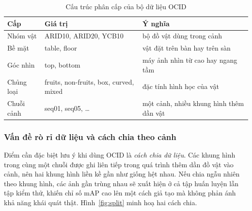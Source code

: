 \begin{table}[H]
\centering
\caption{Cấu trúc phân cấp của bộ dữ liệu OCID}
\label{tab:ocid_cautruc}
\small
\begin{tabularx}{\textwidth}{l l X}
\toprule
\textbf{Cấp} & \textbf{Giá trị} & \textbf{Ý nghĩa} \\
\midrule
Nhóm vật    & ARID10, ARID20, YCB10 & bộ đồ vật dùng trong cảnh \\
Bề mặt      & table, floor          & vật đặt trên bàn hay trên sàn \\
Góc nhìn    & top, bottom           & máy ảnh nhìn từ cao hay ngang tầm \\
Chủng loại  & fruits, non-fruits, box, curved, mixed & đặc tính hình học của vật \\
Chuỗi cảnh  & seq01, seq05, \dots   & một cảnh, nhiều khung hình thêm dần vật \\
\bottomrule
\end{tabularx}
\end{table}

\subsubsection{Vấn đề rò rỉ dữ liệu và cách chia theo cảnh}

Điểm cần đặc biệt lưu ý khi dùng OCID là \emph{cách chia dữ liệu}. Các khung hình trong cùng một
chuỗi được ghi liên tiếp trong quá trình thêm dần đồ vật vào cảnh, nên hai khung hình liền kề
gần như giống hệt nhau. Nếu chia ngẫu nhiên theo khung hình, các ảnh gần trùng nhau sẽ xuất hiện
ở cả tập huấn luyện lẫn tập kiểm thử, khiến chỉ số mAP cao lên một cách giả tạo mà không phản
ánh khả năng khái quát thật. Hình~\ref{fig:split} minh hoạ hai cách chia.


